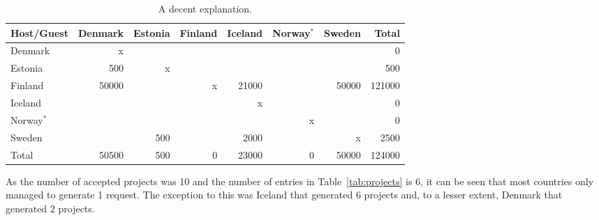 \begin{table}[ht]
\begin{center}
\begin{tabular}{|l|r|r|r|r|r|r|r|} \hline
\bf Host/Guest &Denmark &Estonia &Finland &Iceland &Norway$^*$ &Sweden &Total \\\hline
Denmark & x & & & & & & 0 \\
Estonia & 500 & x & & & & & 500 \\
Finland & 50000 & & x & 21000 & & 50000 & 121000 \\
Iceland & & & & x & & & 0 \\
Norway$^*$  & & & & & x & & 0 \\
Sweden  & & 500 & & 2000 & & x & 2500 \\
\hline
Total & 50500 & 500 & 0 & 23000 & 0 & 50000 & 124000 \\ \hline
\end{tabular}
\caption{A decent explanation. \label{tab:results}}
\end{center}
\end{table}
As the number of accepted projects was 10 and the number of entries in Table~\ref{tab:projects} is 6, it can be seen that most countries only managed to generate 1 request.
The exception to this was Iceland that generated 6 projects and, to a lesser extent, Denmark that generated 2 projects.
